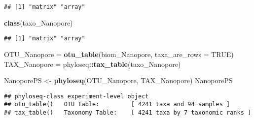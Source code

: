 \documentclass[
]{article}
\newenvironment{Shaded}{\begin{snugshade}}{\end{snugshade}}
\newcommand{\AttributeTok}[1]{\textcolor[rgb]{0.13,0.29,0.53}{#1}}
\newcommand{\ConstantTok}[1]{\textcolor[rgb]{0.56,0.35,0.01}{#1}}
\newcommand{\FunctionTok}[1]{\textcolor[rgb]{0.13,0.29,0.53}{\textbf{#1}}}
\newcommand{\NormalTok}[1]{#1}
\newcommand{\OtherTok}[1]{\textcolor[rgb]{0.56,0.35,0.01}{#1}}
\newcommand{\SpecialCharTok}[1]{\textcolor[rgb]{0.81,0.36,0.00}{\textbf{#1}}}
\begin{document}
\begin{verbatim}
## [1] "matrix" "array"
\end{verbatim}

\begin{Shaded}
\begin{Highlighting}[]
\FunctionTok{class}\NormalTok{(taxo\_Nanopore) }
\end{Highlighting}
\end{Shaded}

\begin{verbatim}
## [1] "matrix" "array"
\end{verbatim}

\begin{Shaded}
\begin{Highlighting}[]
\NormalTok{OTU\_Nanopore }\OtherTok{=} \FunctionTok{otu\_table}\NormalTok{(biom\_Nanopore, }\AttributeTok{taxa\_are\_rows =} \ConstantTok{TRUE}\NormalTok{)}
\NormalTok{TAX\_Nanopore }\OtherTok{=}\NormalTok{ phyloseq}\SpecialCharTok{::}\FunctionTok{tax\_table}\NormalTok{(taxo\_Nanopore)}

\NormalTok{NanoporePS }\OtherTok{\textless{}{-}} \FunctionTok{phyloseq}\NormalTok{(OTU\_Nanopore, TAX\_Nanopore)}
\NormalTok{NanoporePS}
\end{Highlighting}
\end{Shaded}

\begin{verbatim}
## phyloseq-class experiment-level object
## otu_table()   OTU Table:         [ 4241 taxa and 94 samples ]
## tax_table()   Taxonomy Table:    [ 4241 taxa by 7 taxonomic ranks ]
\end{verbatim}
\end{document}

